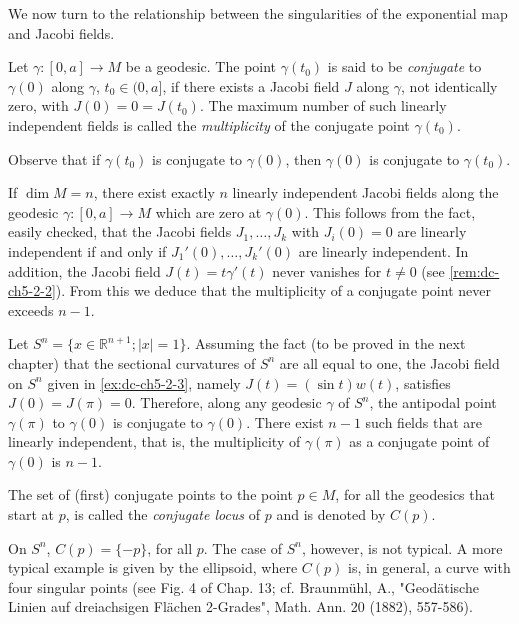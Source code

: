 We now turn to the relationship between the singularities of the exponential map
and Jacobi fields.

\begin{definition}
  \label{def:dc-ch5-3-1}
  Let $\gamma:[0,a]\to M$ be a geodesic. The point $\gamma(t_0)$ is said to be
  \emph{conjugate} to $\gamma(0)$ along $\gamma$, $t_0\in(0,a]$, if there exists a Jacobi
  field $J$ along $\gamma$, not identically zero, with $J(0)=0=J(t_0)$. The maximum
  number of such linearly independent fields is called the \emph{multiplicity} of the
  conjugate point $\gamma(t_0)$.
  
  Observe that if $\gamma(t_0)$ is conjugate to $\gamma(0)$, then $\gamma(0)$ is
  conjugate to $\gamma(t_0)$.
\end{definition}

\begin{remark}[Remark 3.2]
  \label{rem:dc-ch5-3-2}
  If $\dim M=n$, there exist exactly $n$ linearly independent Jacobi fields along
  the geodesic $\gamma:[0,a]\to M$ which are zero at $\gamma(0)$. This follows from
  the fact, easily checked, that the Jacobi fields $J_1,\dots,J_k$ with $J_i(0)=0$
  are linearly independent if and only if $J_1'(0),\dots,J_k'(0)$ are linearly
  independent. In addition, the Jacobi field $J(t)=t\gamma'(t)$ never vanishes for
  $t\neq 0$ (see \cref{rem:dc-ch5-2-2}). From this we deduce that the multiplicity of a
  conjugate point never exceeds $n-1$.
\end{remark}

\begin{example}[Example 3.3]
  \label{ex:dc-ch5-3-3}
  Let $S^n=\{x\in\mathbb{R}^{n+1};|x|=1\}$. Assuming the fact (to be proved in the
  next chapter) that the sectional curvatures of $S^n$ are all equal to one, the
  Jacobi field on $S^n$ given in \cref{ex:dc-ch5-2-3}, namely $J(t)=(\sin t)w(t)$, satisfies
  $J(0)=J(\pi)=0$. Therefore, along any geodesic $\gamma$ of $S^n$, the antipodal
  point $\gamma(\pi)$ to $\gamma(0)$ is conjugate to $\gamma(0)$. There exist $n-1$
  such fields that are linearly independent, that is, the multiplicity of
  $\gamma(\pi)$ as a conjugate point of $\gamma(0)$ is $n-1$.
\end{example}

\begin{definition}
  \label{def:dc-ch5-3-4}
  The set of (first) conjugate points to the point $p\in M$, for all the geodesics
  that start at $p$, is called the \emph{conjugate locus} of $p$ and is denoted by
  $C(p)$.
  
  On $S^n$, $C(p)=\{-p\}$, for all $p$. The case of $S^n$, however, is not typical.
  A more typical example is given by the ellipsoid, where $C(p)$ is, in general, a
  curve with four singular points (see Fig. 4 of Chap. 13; cf. Braunmühl, A.,
  "Geodätische Linien auf dreiachsigen Flächen 2-Grades", Math. Ann. 20 (1882),
  557-586).
\end{definition}

